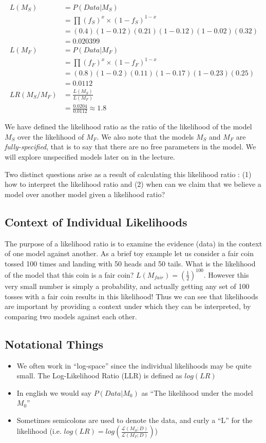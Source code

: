 \documentclass[11pt]{article}
\begin{document}
\begin{align*}
	L(M_S) &= P(Data | M_S)\\
	&= \prod (f_S)^x\times(1-f_S)^{1-x}\\
	&= (0.4)(1-0.12)(0.21)(1-0.12)(1-0.02)(0.32)\\
	&= 0.020399\\
	L(M_F) &= P(Data | M_F)\\
	&= \prod (f_F)^x\times(1-f_F)^{1-x}\\
	&= (0.8)(1-0.2)(0.11)(1-0.17)(1-0.23)(0.25)\\
	&= 0.0112\\
	LR(M_S/M_F) &= \frac{L(M_S)}{L(M_F)}\\
	&= \frac{0.0204}{0.0112} \approx 1.8
\end{align*}

We have defined the likelihood ratio as the ratio of the likelihood of the model $M_S$ over the likelihood of $M_F$. We also note that the models $M_S$ and $M_F$ are \textit{fully-specified}, that is to say that there are no free parameters in the model. We will explore unspecified models later on in the lecture.

Two distinct questions arise as a result of calculating this likelihood ratio : (1) how to interpret the likelihood ratio and (2) when can we claim that we believe a model over another model given a likelihood ratio?

\subsection*{Context of Individual Likelihoods}

The purpose of a likelihood ratio is to examine the evidence (data) in the context of one model against another. As a brief toy example let us consider a fair coin tossed 100 times and landing with 50 heads and 50 tails. What is the likelihood of the model that this coin is a fair coin? $L(M_{fair}) = \left(\frac{1}{2}\right)^{100}$. However this very small number is simply a probability, and actually getting any set of 100 tosses with a fair coin results in this likelihood! Thus we can see that likelihoods are important by providing a context under which they can be interpreted, by comparing two models against each other.  

\subsection*{Notational Things}
\begin{itemize}
\item We often work in ``log-space'' since the individual likelihoods may be quite small. The Log-Likelihood Ratio (LLR) is defined as $log(LR)$
\item In english we would say $P(Data | M_0)$ as ``The likelihood under the model $M_0$''
\item Sometimes semicolons are used to denote the data, and curly a ``L'' for the likelihood (i.e. $log(LR) = log\left( \frac{\mathcal{L}(M_S ; D)}{ \mathcal{L}(M_F ; D)}\right)$)
\end{itemize}
\end{document}
